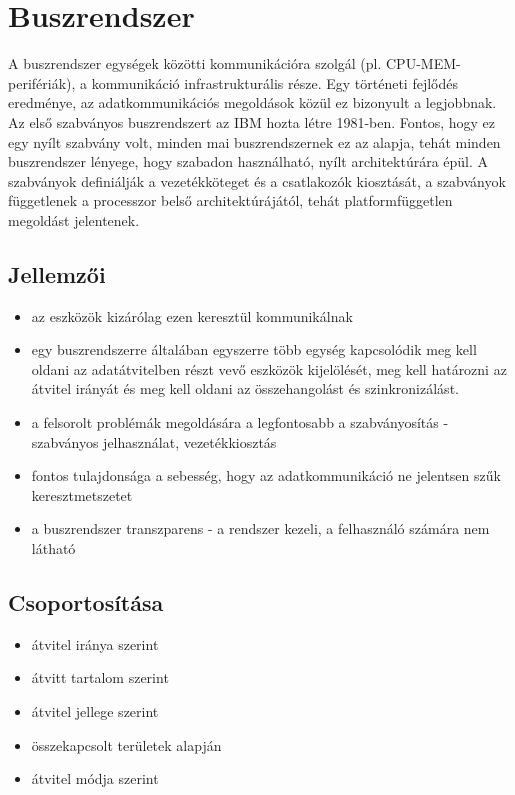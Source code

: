 
\chapter{Buszrendszer}

A buszrendszer egységek közötti kommunikációra szolgál (pl. CPU-MEM-perifériák), a kommunikáció infrastrukturális része.
Egy történeti fejlődés eredménye, az adatkommunikációs megoldások közül ez bizonyult a legjobbnak.
Az első szabványos buszrendszert az IBM hozta létre 1981-ben.
Fontos, hogy ez egy nyílt szabvány volt, minden mai buszrendszernek ez az alapja, tehát minden buszrendszer lényege, hogy szabadon használható, nyílt architektúrára épül.
A szabványok definiálják a vezetékköteget és a csatlakozók kiosztását, a szabványok függetlenek a processzor belső architektúrájától, tehát platformfüggetlen megoldást jelentenek.

\section{Jellemzői}
\begin{itemize}
    \item az eszközök kizárólag ezen keresztül kommunikálnak
    \item egy buszrendszerre általában egyszerre több egység kapcsolódik \textrightarrow meg kell oldani az adatátvitelben részt vevő eszközök kijelölését, meg kell határozni az átvitel irányát és meg kell oldani az összehangolást és szinkronizálást.
    \item a felsorolt problémák megoldására a legfontosabb a szabványosítás - szabványos jelhasználat, vezetékkiosztás
    \item fontos tulajdonsága a sebesség, hogy az adatkommunikáció ne jelentsen szűk keresztmetszetet
    \item a buszrendszer transzparens - a rendszer kezeli, a felhasználó számára nem látható
\end{itemize}

\section{Csoportosítása}
\begin{itemize}
    \item átvitel iránya szerint
    \item átvitt tartalom szerint
    \item átvitel jellege szerint
    \item összekapcsolt területek alapján
    \item átvitel módja szerint
\end{itemize}

